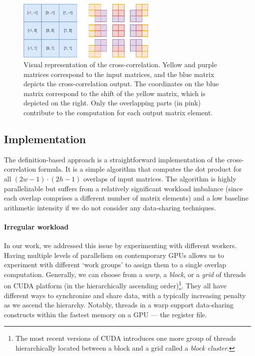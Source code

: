 \begin{figure}
    \centering
    \includegraphics[width=0.6\textwidth]{img/cc.png}
    \caption{Visual representation of the cross-correlation. Yellow and purple matrices correspond to the input matrices, and the blue matrix depicts the cross-correlation output. The coordinates on the blue matrix correspond to the shift of the yellow matrix, which is depicted on the right. Only the overlapping parts (in pink) contribute to the computation for each output matrix element.}
    \label{fig:cross-correlation}
\end{figure}

\subsection{Implementation}

The definition-based approach is a straightforward implementation of the cross-correlation formula. It is a simple algorithm that computes the dot product for all $(2w - 1) \cdot (2h -1)$ overlaps of input matrices. The algorithm is highly parallelizable but suffers from a relatively significant workload imbalance (since each overlap comprises a different number of matrix elements) and a low baseline arithmetic intensity if we do not consider any data-sharing techniques. 

\paragraph{Irregular workload} In our work, we addressed this issue by experimenting with different workers. Having multiple levels of parallelism on contemporary GPUs allows us to experiment with different `work groups' to assign them to a single overlap computation. Generally, we can choose from a \emph{warp}, a \emph{block}, or a \emph{grid} of threads on CUDA platform (in the hierarchically ascending order)\footnote{The most recent versions of CUDA introduces one more group of threads hierarchically located between a block and a grid called a \emph{block cluster}.}. They all have different ways to synchronize and share data, with a typically increasing penalty as we ascend the hierarchy. Notably, threads in a warp support data-sharing constructs within the fastest memory on a GPU --- the register file. 

